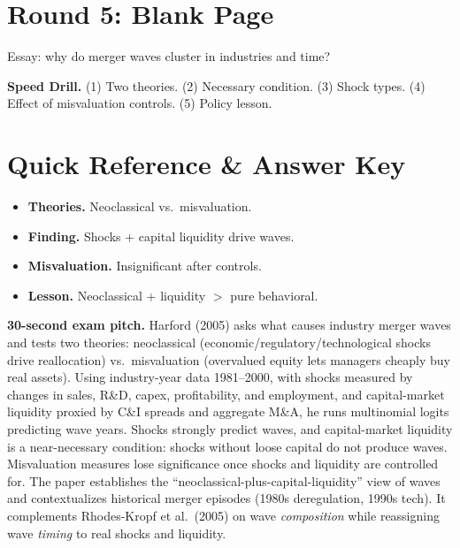 \documentclass[11pt]{article}
\begin{document}
\section*{Round 5: Blank Page}
Essay: why do merger waves cluster in industries and time?

\vspace{6pt}
\begin{drillbox}
\textbf{Speed Drill.} (1) Two theories. (2) Necessary condition. (3) Shock types. (4) Effect of misvaluation controls. (5) Policy lesson.
\end{drillbox}

\section*{Quick Reference \& Answer Key}
\begin{answerbox}
\begin{itemize}
\item \textbf{Theories.} Neoclassical vs.\ misvaluation.
\item \textbf{Finding.} Shocks + capital liquidity drive waves.
\item \textbf{Misvaluation.} Insignificant after controls.
\item \textbf{Lesson.} Neoclassical + liquidity $>$ pure behavioral.
\end{itemize}
\end{answerbox}

\begin{keybox}
\textbf{30-second exam pitch.} Harford (2005) asks what causes industry merger waves and tests two theories: neoclassical (economic/regulatory/technological shocks drive reallocation) vs.\ misvaluation (overvalued equity lets managers cheaply buy real assets). Using industry-year data 1981--2000, with shocks measured by changes in sales, R\&D, capex, profitability, and employment, and capital-market liquidity proxied by C\&I spreads and aggregate M\&A, he runs multinomial logits predicting wave years. Shocks strongly predict waves, and capital-market liquidity is a near-necessary condition: shocks without loose capital do not produce waves. Misvaluation measures lose significance once shocks and liquidity are controlled for. The paper establishes the ``neoclassical-plus-capital-liquidity'' view of waves and contextualizes historical merger episodes (1980s deregulation, 1990s tech). It complements Rhodes-Kropf et al.\ (2005) on wave \emph{composition} while reassigning wave \emph{timing} to real shocks and liquidity.
\end{keybox}
\end{document}
